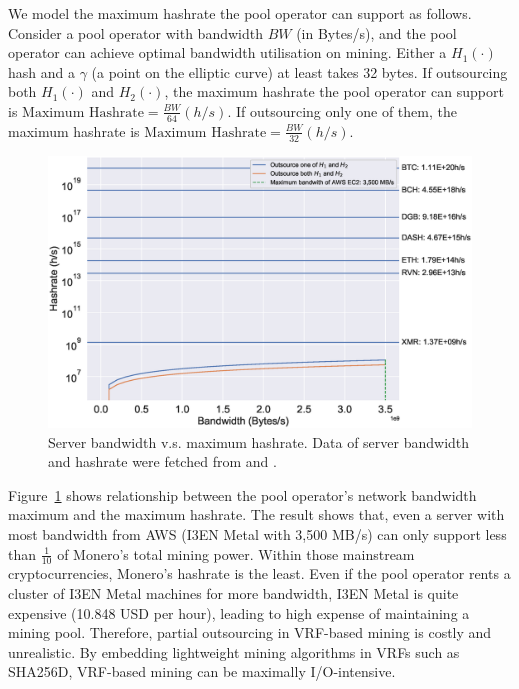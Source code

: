 We model the maximum hashrate the pool operator can support as follows.
Consider a pool operator with bandwidth $BW$ (in Bytes/s), and the pool operator can achieve optimal bandwidth utilisation on mining.
Either a $H_1(\cdot)$ hash and a $\gamma$ (a point on the elliptic curve) at least takes 32 bytes.
If outsourcing both $H_1(\cdot)$ and $H_2(\cdot)$, the maximum hashrate the pool operator can support is $\text{Maximum Hashrate} = \frac{BW}{64} (h/s)$.
If outsourcing only one of them, the maximum hashrate is $\text{Maximum Hashrate} = \frac{BW}{32} (h/s)$.


\begin{figure}[htp]
    \centering
    \includegraphics[width=\linewidth]{figs/max-hashrate.eps}
    \caption{Server bandwidth v.s. maximum hashrate.
    Data of server bandwidth and hashrate were fetched from \cite{aws} and \cite{coinwarz}.}
    \label{fig:max-hashrate}
\end{figure}

Figure~\ref{fig:max-hashrate} shows relationship between the pool operator's network bandwidth maximum and the maximum hashrate.
The result shows that, even a server with most bandwidth from AWS (I3EN Metal with 3,500 MB/s) can only support less than $\frac{1}{10}$ of Monero's total mining power.
Within those mainstream cryptocurrencies, Monero's hashrate is the least.
Even if the pool operator rents a cluster of I3EN Metal machines for more bandwidth, I3EN Metal is quite expensive (10.848 USD per hour), leading to high expense of maintaining a mining pool.
Therefore, partial outsourcing in VRF-based mining is costly and unrealistic.
By embedding lightweight mining algorithms in VRFs such as SHA256D, VRF-based mining can be maximally I/O-intensive.
